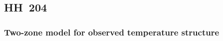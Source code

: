 \documentclass[twocolumn]{aastex63}
\newcommand{\eduardo}[1]{{\color{teal}E: #1}}
\begin{document}

\subsection{HH~204}
\label{subsec:disc_hh204}



 
\subsubsection{Two-zone model for observed temperature structure}
\end{document}
